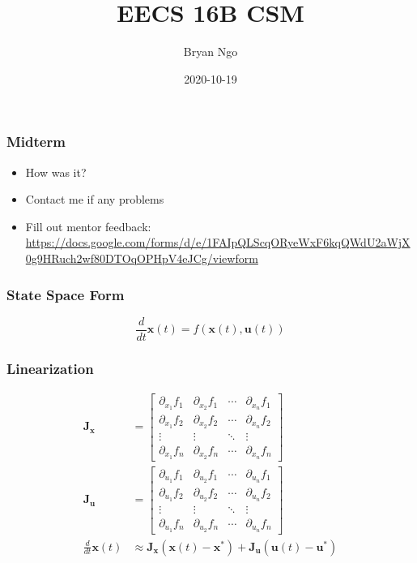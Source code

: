\documentclass[aspectratio=169]{beamer}
\title{EECS 16B CSM}
\author{Bryan Ngo}
\date{2020-10-19}
\institute{UC Berkeley}
\newcommand{\diff}[1]{\frac{d}{d #1}}
\begin{document}
\begin{frame}
    \maketitle
\end{frame}

\begin{frame}
    \frametitle{Midterm}

    \begin{itemize}
        \item How was it?
        \item Contact me if any problems
        \item Fill out mentor feedback: \url{https://docs.google.com/forms/d/e/1FAIpQLScqORyeWxF6kqQWdU2aWjX0g9HRuch2wf80DTOqOPHpV4eJCg/viewform}
    \end{itemize}
\end{frame}

\begin{frame}
    \frametitle{State Space Form}

    \begin{equation}
        \diff{t} \bm{x}(t) = f(\bm{x}(t), \bm{u}(t))
    \end{equation}
\end{frame}

\begin{frame}
    \frametitle{Linearization}

    \begin{align}
        \bm{J}_{\bm{x}} &=
        \begin{bmatrix}
            \partial_{x_1} f_1 & \partial_{x_2} f_1 & \cdots & \partial_{x_n} f_1 \\
            \partial_{x_1} f_2 & \partial_{x_2} f_2 & \cdots & \partial_{x_n} f_2 \\
            \vdots & \vdots & \ddots & \vdots \\
            \partial_{x_1} f_n & \partial_{x_2} f_n & \cdots & \partial_{x_n} f_n
        \end{bmatrix} \\
        \bm{J}_{\bm{u}} &=
        \begin{bmatrix}
            \partial_{u_1} f_1 & \partial_{u_2} f_1 & \cdots & \partial_{u_n} f_1 \\
            \partial_{u_1} f_2 & \partial_{u_2} f_2 & \cdots & \partial_{u_n} f_2 \\
            \vdots & \vdots & \ddots & \vdots \\
            \partial_{u_1} f_n & \partial_{u_2} f_n & \cdots & \partial_{u_n} f_n
        \end{bmatrix} \\
        \diff{t} \bm{x}(t) &\approx \bm{J}_{\bm{x}} (\bm{x}(t) - \bm{x}^\ast) + \bm{J}_{\bm{u}} (\bm{u}(t) -\bm{u}^\ast)
    \end{align}
\end{frame}
\end{document}
